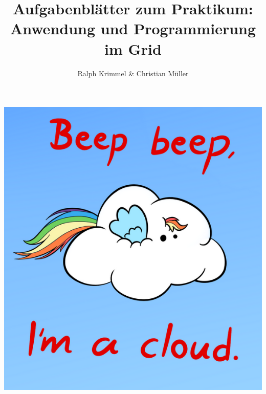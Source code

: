 \documentclass{article}
\title{Aufgabenbl\"atter zum Praktikum: Anwendung und Programmierung im Grid}
\author{Ralph Krimmel \& Christian M\"uller}
\begin{document}
\maketitle{}
\vspace{2cm}
\begin{center}
	\includegraphics[scale=0.4]{logo.png}
\end{center}
\newpage
\tableofcontents
\newpage
%
%
%
%

\end{document}
